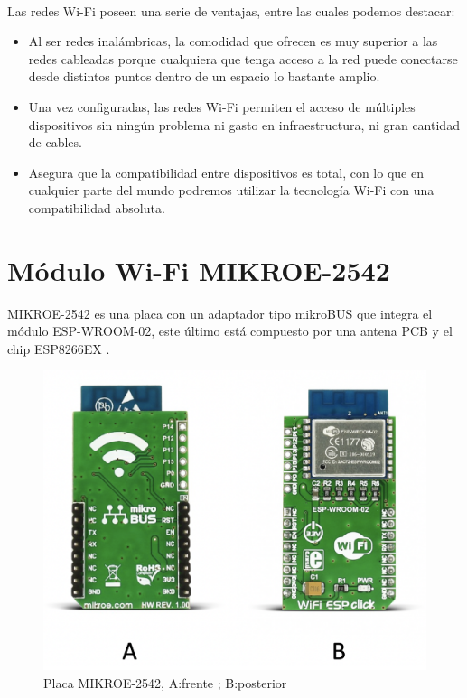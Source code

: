 \paragraph{}
Las redes Wi-Fi poseen una serie de ventajas, entre las cuales podemos destacar:
\begin{itemize}
	\item Al ser redes inalámbricas, la comodidad que ofrecen es muy superior a las redes cableadas porque cualquiera que tenga acceso a la red puede conectarse desde distintos puntos dentro de un espacio lo bastante amplio.
    \item Una vez configuradas, las redes Wi-Fi permiten el acceso de múltiples dispositivos sin ningún problema ni gasto en infraestructura, ni gran cantidad de cables.
    \item Asegura que la compatibilidad entre dispositivos es total, con lo que en cualquier parte del mundo podremos utilizar la tecnología Wi-Fi con una compatibilidad absoluta. 
\end{itemize}
 
 
 
\section{Módulo Wi-Fi MIKROE-2542}

MIKROE-2542 es una placa con un adaptador tipo mikroBUS que integra el módulo ESP-WROOM-02, este último está compuesto por una antena PCB y el chip ESP8266EX \citep{MarcoTeorico5}.

\begin{figure}[H]
	\centering
	\includegraphics[scale=.4]{Capitulo2/images/mikroe.png}
	\caption{Placa MIKROE-2542, A:frente ; B:posterior}
	\label{fig:diagrama_dispensador}
\end{figure}

